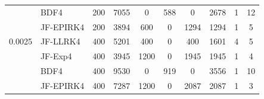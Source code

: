 \begin{table}[htb]
\begin{adjustbox}{width=0.9\columnwidth,center}
\begin{tabular}{cccccccccc}
			\multicolumn{1}{l}{} & \multicolumn{1}{l}{BDF4} & 200 & 7055 & 0 & 588 & 0 &
			2678 & 1 & 12 \\
			\multicolumn{1}{l}{} & \multicolumn{1}{l}{JF-EPIRK4} & 200 & 3894 & 600 & 0 &
			1294 & 1294 & 1 & 5 \\
			\multicolumn{1}{l}{0.0025} & \multicolumn{1}{l}{JF-LLRK4} & 400 & 5201 & 400
			& 0 & 400 & 1601 & 4 & 5 \\
			\multicolumn{1}{l}{} & \multicolumn{1}{l}{JF-Exp4} & 400 & 3945 & 1200 & 0 &
			1945 & 1945 & 1 & 4 \\
			\multicolumn{1}{l}{} & \multicolumn{1}{l}{BDF4} & 400 & 9530 & 0 & 919 & 0 &
			3556 & 1 & 10 \\
			\multicolumn{1}{l}{} & \multicolumn{1}{l}{JF-EPIRK4} & 400 & 7287 & 1200 & 0 &
			2087 & 2087 & 1 & 3 \\
			\hline
		\end{tabular}
	\end{adjustbox}
	\label{tab:br}
\end{table}

